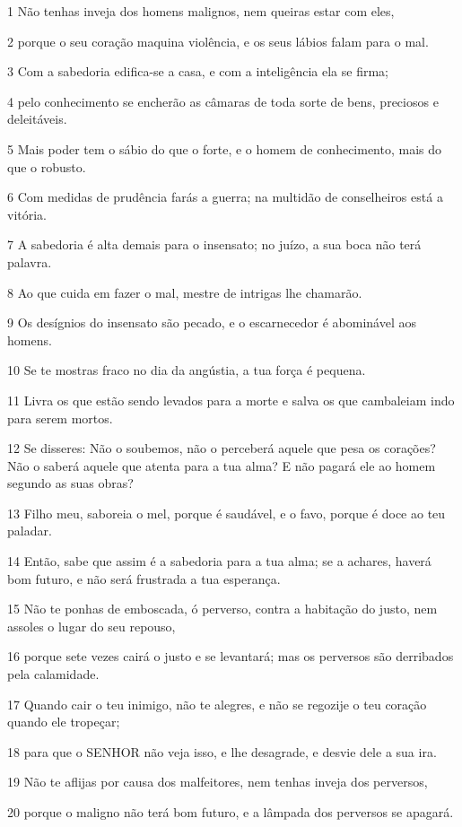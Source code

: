 \par 1 Não tenhas inveja dos homens malignos, nem queiras estar com eles,
\par 2 porque o seu coração maquina violência, e os seus lábios falam para o mal.
\par 3 Com a sabedoria edifica-se a casa, e com a inteligência ela se firma;
\par 4 pelo conhecimento se encherão as câmaras de toda sorte de bens, preciosos e deleitáveis.
\par 5 Mais poder tem o sábio do que o forte, e o homem de conhecimento, mais do que o robusto.
\par 6 Com medidas de prudência farás a guerra; na multidão de conselheiros está a vitória.
\par 7 A sabedoria é alta demais para o insensato; no juízo, a sua boca não terá palavra.
\par 8 Ao que cuida em fazer o mal, mestre de intrigas lhe chamarão.
\par 9 Os desígnios do insensato são pecado, e o escarnecedor é abominável aos homens.
\par 10 Se te mostras fraco no dia da angústia, a tua força é pequena.
\par 11 Livra os que estão sendo levados para a morte e salva os que cambaleiam indo para serem mortos.
\par 12 Se disseres: Não o soubemos, não o perceberá aquele que pesa os corações? Não o saberá aquele que atenta para a tua alma? E não pagará ele ao homem segundo as suas obras?
\par 13 Filho meu, saboreia o mel, porque é saudável, e o favo, porque é doce ao teu paladar.
\par 14 Então, sabe que assim é a sabedoria para a tua alma; se a achares, haverá bom futuro, e não será frustrada a tua esperança.
\par 15 Não te ponhas de emboscada, ó perverso, contra a habitação do justo, nem assoles o lugar do seu repouso,
\par 16 porque sete vezes cairá o justo e se levantará; mas os perversos são derribados pela calamidade.
\par 17 Quando cair o teu inimigo, não te alegres, e não se regozije o teu coração quando ele tropeçar;
\par 18 para que o SENHOR não veja isso, e lhe desagrade, e desvie dele a sua ira.
\par 19 Não te aflijas por causa dos malfeitores, nem tenhas inveja dos perversos,
\par 20 porque o maligno não terá bom futuro, e a lâmpada dos perversos se apagará.
